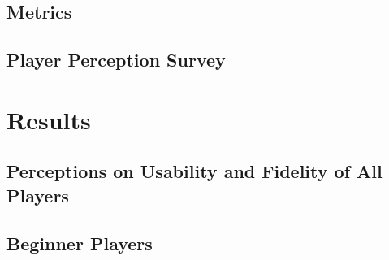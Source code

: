 \subsection{Metrics}





\subsection{Player Perception Survey}





\section{Results}

\subsection{Perceptions on Usability and Fidelity of All Players}


\subsection{Beginner Players}

